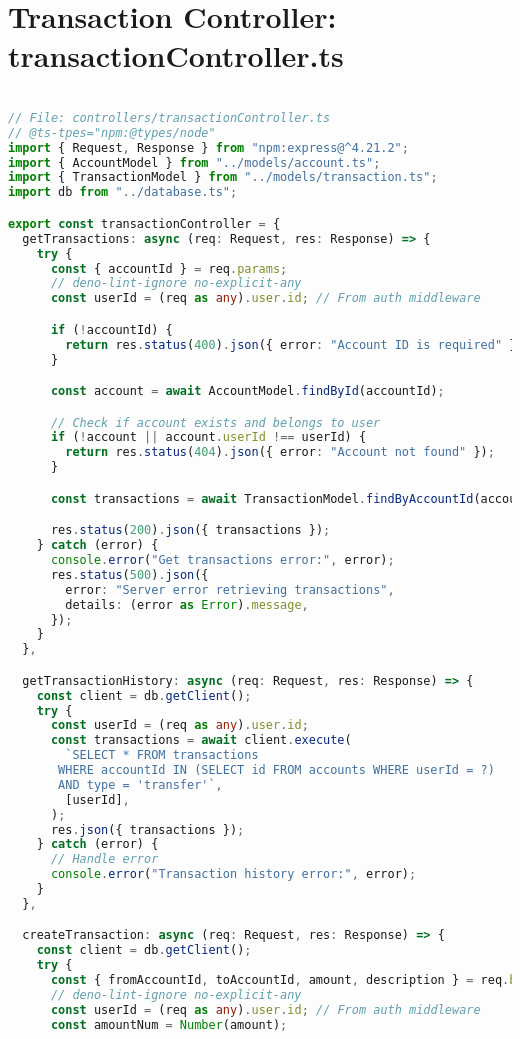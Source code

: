 \section{Transaction Controller: transactionController.ts}
\begin{lstlisting}[language=TypeScript]

// File: controllers/transactionController.ts
// @ts-tpes="npm:@types/node"
import { Request, Response } from "npm:express@^4.21.2";
import { AccountModel } from "../models/account.ts";
import { TransactionModel } from "../models/transaction.ts";
import db from "../database.ts";

export const transactionController = {
  getTransactions: async (req: Request, res: Response) => {
    try {
      const { accountId } = req.params;
      // deno-lint-ignore no-explicit-any
      const userId = (req as any).user.id; // From auth middleware

      if (!accountId) {
        return res.status(400).json({ error: "Account ID is required" });
      }

      const account = await AccountModel.findById(accountId);

      // Check if account exists and belongs to user
      if (!account || account.userId !== userId) {
        return res.status(404).json({ error: "Account not found" });
      }

      const transactions = await TransactionModel.findByAccountId(accountId);

      res.status(200).json({ transactions });
    } catch (error) {
      console.error("Get transactions error:", error);
      res.status(500).json({
        error: "Server error retrieving transactions",
        details: (error as Error).message,
      });
    }
  },

  getTransactionHistory: async (req: Request, res: Response) => {
    const client = db.getClient();
    try {
      const userId = (req as any).user.id;
      const transactions = await client.execute(
        `SELECT * FROM transactions
       WHERE accountId IN (SELECT id FROM accounts WHERE userId = ?)
       AND type = 'transfer'`,
        [userId],
      );
      res.json({ transactions });
    } catch (error) {
      // Handle error
      console.error("Transaction history error:", error);
    }
  },

  createTransaction: async (req: Request, res: Response) => {
    const client = db.getClient();
    try {
      const { fromAccountId, toAccountId, amount, description } = req.body;
      // deno-lint-ignore no-explicit-any
      const userId = (req as any).user.id; // From auth middleware
      const amountNum = Number(amount);



\end{lstlisting}
